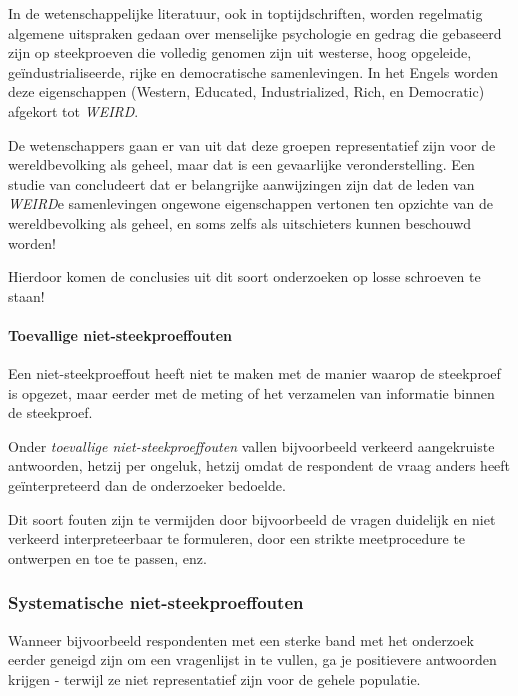 \begin{example}
  In de wetenschappelijke literatuur, ook in toptijdschriften, worden regelmatig algemene uitspraken gedaan over menselijke psychologie en gedrag die gebaseerd zijn op steekproeven die volledig genomen zijn uit westerse, hoog opgeleide, ge\"industrialiseerde, rijke en democratische samenlevingen. In het Engels worden deze eigenschappen (Western, Educated, Industrialized, Rich, en Democratic) afgekort tot \emph{WEIRD}.
  
  De wetenschappers gaan er van uit dat deze groepen representatief zijn voor de wereldbevolking als geheel, maar dat is een gevaarlijke veronderstelling. Een studie van \textcite{HenrichEtAl2010} concludeert dat er belangrijke aanwijzingen zijn dat de leden van \emph{WEIRD}e samenlevingen ongewone eigenschappen vertonen ten opzichte van de wereldbevolking als geheel, en soms zelfs als uitschieters kunnen beschouwd worden!
  
  Hierdoor komen de conclusies uit dit soort onderzoeken op losse schroeven te staan!
\end{example}

\paragraph{Toevallige niet-steekproeffouten}

Een niet-steekproeffout heeft niet te maken met de manier waarop de steekproef is opgezet, maar eerder met de meting of het verzamelen van informatie binnen de steekproef.

Onder \emph{toevallige niet-steekproeffouten} vallen bijvoorbeeld verkeerd aangekruiste antwoorden, hetzij per ongeluk, hetzij omdat de respondent de vraag anders heeft ge\"interpreteerd dan de onderzoeker bedoelde.

Dit soort fouten zijn te vermijden door bijvoorbeeld de vragen duidelijk en niet verkeerd interpreteerbaar te formuleren, door een strikte meetprocedure te ontwerpen en toe te passen, enz.

\subsubsection{Systematische niet-steekproeffouten}

Wanneer bijvoorbeeld respondenten met een sterke band met het onderzoek eerder geneigd zijn om een vragenlijst in te vullen, ga je positievere antwoorden krijgen - terwijl ze niet representatief zijn voor de gehele populatie.

